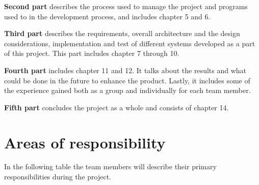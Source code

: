 \textbf{Second part} describes the process used to manage the project and programs used to in the development process, and includes chapter 5 and 6.

\textbf{Third part} describes the requirements, overall architecture and the design considerations, implementation and test of different systems developed as a part of this project. This part includes chapter 7 through 10.

\textbf{Fourth part} includes chapter 11 and 12. It talks about the results and what could be done in the future to enhance the product. Lastly, it includes some of the experience gained both as a group and individually for each team member.

\textbf{Fifth part} concludes the project as a whole and consists of chapter 14.

\clearpage
\section{Areas of responsibility}
In the following table the team members will describe their primary responsibilities during the project. 

